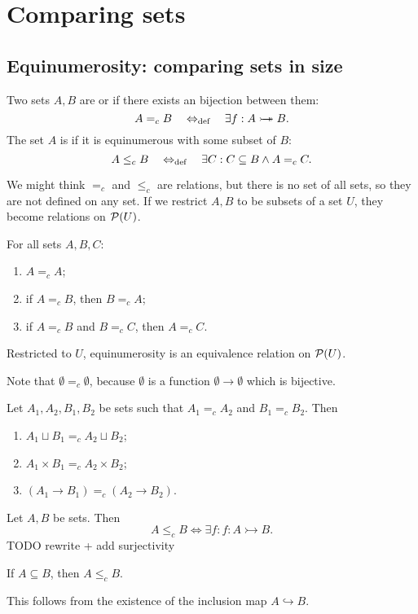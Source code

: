 \chapter{Comparing sets}
\section{Equinumerosity: comparing sets in size}
\begin{definition}
Two sets $A,B$ are  or  if there exists an bijection between them:
\[ A =_c B \quad\Leftrightarrow_{\text{def}}\quad \exists f: A\mathrel{\rightarrowtail\kern-1.9ex\twoheadrightarrow} B. \]
The set $A$ is  if it is equinumerous with some subset of $B$:
\[ A \leq_c B \quad\Leftrightarrow_{\text{def}}\quad \exists C: C\subseteq B \land A=_c C. \]
\end{definition}
We might think $=_c$ and $\leq_c$ are relations, but there is no set of all sets, so they are not defined on any set. If we restrict $A,B$ to be subsets of a set $U$, they become relations on $\operatorname{\mathcal{P}}(U)$.
\begin{proposition}
For all sets $A,B,C$:
\begin{enumerate}
\item $A =_c A$;
\item if $A=_c B$, then $B =_c A$;
\item if $A=_c B$ and $B =_c C$, then $A =_c C$.
\end{enumerate}
Restricted to $U$, equinumerosity is an equivalence relation on $\operatorname{\mathcal{P}}(U)$.
\end{proposition}

Note that $\emptyset =_c \emptyset$, because $\emptyset$ is a function $\emptyset\to \emptyset$ which is bijective.

\begin{lemma} \label{welldefinedCardinalArithemtic}
Let $A_1,A_2,B_1,B_2$ be sets such that $A_1=_c A_2$ and $B_1=_cB_2$. Then
\begin{enumerate}
\item $A_1 \sqcup B_1 =_c A_2\sqcup B_2$;
\item $A_1 \times B_1 =_c A_2\times B_2$;
\item $(A_1\to B_1) =_c (A_2\to B_2)$.
\end{enumerate}
\end{lemma}

\begin{proposition} \label{injectivityCardinality}
Let $A,B$ be sets. Then
\[ A\leq_c B \iff \exists f: f:A\rightarrowtail B. \]
TODO rewrite + add surjectivity
\end{proposition}
\begin{corollary}
If $A\subseteq B$, then $A\leq_c B$.
\end{corollary}
This follows from the existence of the inclusion map $A \hookrightarrow B$.

